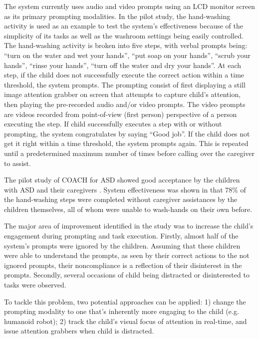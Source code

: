 The system currently uses audio and video prompts using an LCD monitor screen as its primary prompting modalities.  In the pilot study, the hand-washing activity is used as an example to test the system's effectiveness because of the simplicity of its tasks as well as the washroom settings being easily controlled.  The hand-washing activity is broken into five steps, with verbal prompts being: ``turn on the water and wet your hands'', ``put soap on your hands'', ``scrub your hands'', ``rinse your hands'', ``turn off the water and dry your hands''.  At each step, if the child does not successfully execute the correct action within a time threshold, the system prompts.  The prompting consist of first displaying a still image attention grabber on screen that attempts to capture child's attention, then playing the pre-recorded audio and/or video prompts.  The video prompts are videos recorded from point-of-view (first person) perspective of a person executing the step.  If child successfully executes a step with or without prompting, the system congratulates by saying ``Good job''.  If the child does not get it right within a time threshold, the system prompts again.  This is repeated until a predetermined maximum number of times before calling over the caregiver to assist.  


The pilot study of COACH for ASD showed good acceptance by the children with ASD and their caregivers \cite{bimbrahw2012investigating}.  System effectiveness was shown in that 78\% of the hand-washing steps were completed without caregiver assistances by the children themselves, all of whom were unable to wash-hands on their own before.


The major area of improvement identified in the study was to increase the child's engagement during prompting and task execution.  Firstly, almost half of the system's prompts were ignored by the children.  Assuming that these children were able to understand the prompts, as seen by their correct actions to the not ignored prompts, their noncompliance is a reflection of their disinterest in the prompts.  Secondly, several occasions of child being distracted or disinterested to tasks were observed.


To tackle this problem, two potential approaches can be applied: 1) change the prompting modality to one that's inherently more engaging to the child (e.g. humanoid robot); 2) track the child's visual focus of attention in real-time, and issue attention grabbers when child is distracted.
